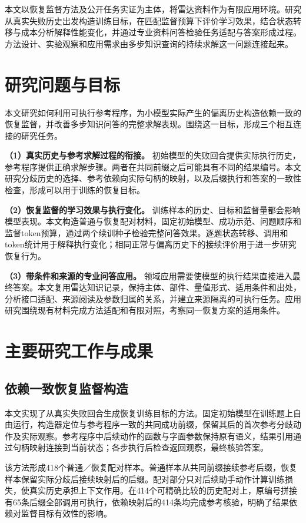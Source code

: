 本文以恢复监督方法及公开任务实证为主体，将雷达资料作为有限应用环境。研究从真实失败历史出发构造训练目标，在匹配监督预算下评价学习效果，结合状态转移与成本分析解释性能变化，并通过专业资料问答检验任务适配与答案形成过程。方法设计、实验观察和应用需求由多步知识查询的持续求解这一问题连接起来。

\section{研究问题与目标}

本文研究如何利用可执行参考程序，为小模型实际产生的偏离历史构造依赖一致的恢复监督，并改善多步知识问答的完整求解表现。围绕这一目标，形成三个相互连接的研究任务。

\textbf{（1）真实历史与参考求解过程的衔接。}
初始模型的失败回合提供实际执行历史，参考程序提供正确求解步骤。两者在共同前缀之后可能具有不同的结果编号。本文研究分歧历史的选择、参考依赖向实际句柄的映射，以及后缀执行和答案的一致性检查，形成可以用于训练的恢复目标。

\textbf{（2）恢复监督的学习效果与执行变化。}
训练样本的历史、目标和监督量都会影响模型表现。本文构造普通与恢复配对材料，固定初始模型、成功示范、问题顺序和监督token预算，通过两个续训种子检验完整问答效果。逐题状态转移、调用和token统计用于解释执行变化；相同正常与偏离历史下的接续评价用于进一步研究恢复行为。

\textbf{（3）带条件和来源的专业问答应用。}
领域应用需要使模型的执行结果直接进入最终答案。本文复用雷达知识记录，保持主体、部件、量值形式、适用条件和出处，分析接口适配、来源阅读及参数归属的关系，并建立来源隔离的可执行任务。应用研究围绕现有材料完成方法适配和有限对照，考察同一恢复方案的适用条件。

\section{主要研究工作与成果}

\subsection{依赖一致恢复监督构造}

本文实现了从真实失败回合生成恢复训练目标的方法。固定初始模型在训练题上自由运行，构造器定位与参考程序一致的共同成功前缀，保留其后的首次参考分歧动作及实际观察。参考程序中后续动作的函数与字面参数保持原有语义，结果引用通过句柄映射连接到当前状态；各步执行后检查返回观察，最终核验答案。

该方法形成418个普通／恢复配对样本。普通样本从共同前缀接续参考后缀，恢复样本保留实际分歧后接续映射后的后缀。配对部分只对后续助手动作计算训练损失，使真实历史承担上下文作用。在414个可精确比较的历史配对上，原编号拼接有65条后缀全部调用可执行，依赖映射后的414条均完成参考核验，明确了结果依赖对监督目标有效性的影响。

